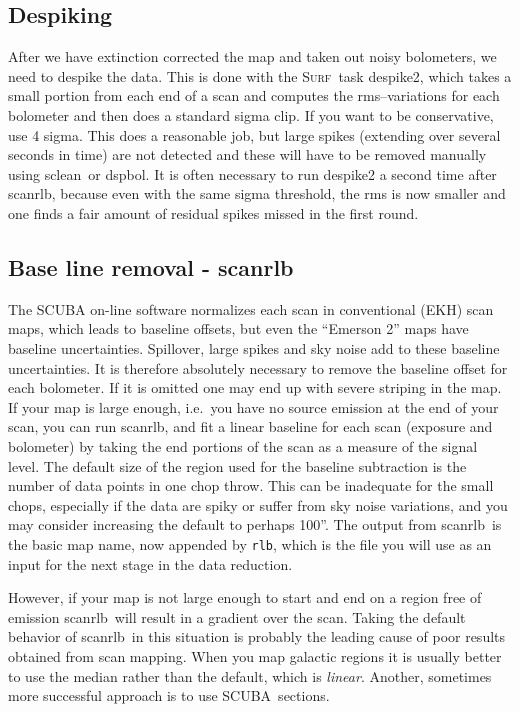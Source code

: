 \documentclass[twoside,11pt]{article}
\newcommand{\scuba}{\htmladdnormallink{SCUBA}{http://www.jach.hawaii.edu/JCMT/}}
\newcommand{\surf}{\xref{\textsc{Surf}}{sun216}{}}
\newcommand{\task}[1]{\textsf{#1}}
\newcommand{\desp}{\xref{\task{despike}}{sun216}{DESPIKE}}
\newcommand{\dspbol}{\xref{\task{dspbol}}{sun216}{DSPBOL}}
\newcommand{\scanrlb}{\xref{\task{scan\_rlb}}{sun216}{SCAN_RLB}}
\newcommand{\sclean}{\xref{\task{sclean}}{sun86}{SCLEAN}}
\newcommand{\htmladdnormallink}[2]{#1}
\newcommand{\xref}[3]{#1}
\newcommand{\xlabel}[1]{}
\renewcommand{\_}{\texttt{\symbol{95}}}
\begin{document}
\subsection{\xlabel{despiking_scan_maps}Despiking}

After we have extinction corrected the map and taken out noisy
bolometers, we need to despike the data.  This is done with the \surf\
task \desp2, which takes a small portion from each end of a scan and
computes the rms--variations for each bolometer and then does a
standard sigma clip.  If you want to be conservative, use 4 sigma.
This does a reasonable job, but large spikes (extending over several
seconds in time) are not detected and these will have to be removed
manually using \sclean\ or \dspbol.  It is often necessary to run
\desp2 a second time after \scanrlb, because even with the same sigma
threshold, the rms is now smaller and one finds a fair amount of
residual spikes missed in the first round.


\subsection{\xlabel{Base_line_removal}Base line removal - \scanrlb}

The SCUBA on-line software normalizes each scan in conventional (EKH)
scan maps, which leads to baseline offsets, but even the ``Emerson 2''
maps have baseline uncertainties.  Spillover, large spikes and sky
noise add to these baseline uncertainties.  It is therefore absolutely
necessary to remove the baseline offset for each bolometer.  If it is
omitted one may end up with severe striping in the map.  If your map
is large enough, i.e.\ you have no source emission at the end of your
scan, you can run \scanrlb, and fit a linear baseline for each scan
(exposure and bolometer) by taking the end portions of the scan as a
measure of the signal level.  The default size of the region used for
the baseline subtraction is the number of data points in one chop
throw.  This can be inadequate for the small chops, especially if the
data are spiky or suffer from sky noise variations, and you may
consider increasing the default to perhaps 100''.  The output from
\scanrlb\ is the basic map name, now appended by \texttt{\_rlb}, which
is the file you will use as an input for the next stage in the data
reduction.


However, if your map is not large enough to start and end on a region
free of emission \scanrlb\ will result in a gradient over the scan.
Taking the default behavior of \scanrlb\ in this situation
is probably the leading cause of poor results obtained from scan
mapping.  When you map galactic regions it is usually better to use
the median rather than the default, which is \textit{linear}.  Another,
sometimes more successful approach is to use \scuba\ sections.
\end{document}
